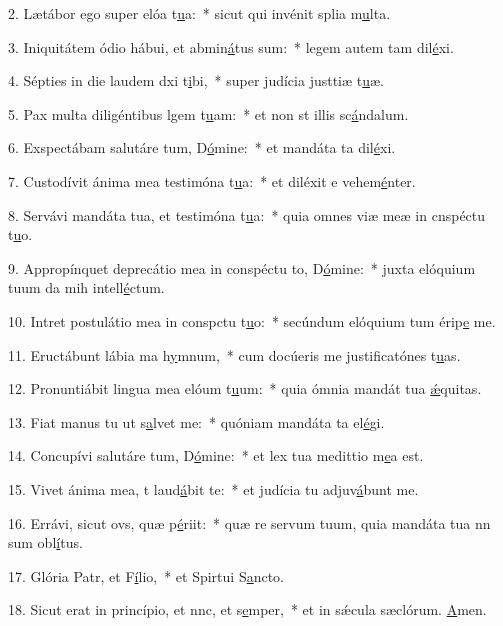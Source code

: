 2. Lætábor ego super elóa t\uline{u}a:~* sicut qui invénit splia m\uline{u}lta.\par 
3. Iniquitátem ódio hábui, et abmin\uline{á}tus sum:~* legem autem tam dil\uline{é}xi.\par 
4. Sépties in die laudem dxi t\uline{i}bi,~* super judícia justtiæ t\uline{u}æ.\par 
5. Pax multa diligéntibus lgem t\uline{u}am:~* et non st illis sc\uline{á}ndalum.\par 
6. Exspectábam salutáre tum, D\uline{ó}mine:~* et mandáta ta dil\uline{é}xi.\par 
7. Custodívit ánima mea testimóna t\uline{u}a:~* et diléxit e vehem\uline{é}nter.\par 
8. Servávi mandáta tua, et testimóna t\uline{u}a:~* quia omnes viæ meæ in cnspéctu t\uline{u}o.\par 
9. Appropínquet deprecátio mea in conspéctu to, D\uline{ó}mine:~* juxta elóquium tuum da mih intell\uline{é}ctum.\par 
10. Intret postulátio mea in conspctu t\uline{u}o:~* secúndum elóquium tum érip\uline{e} me.\par 
11. Eructábunt lábia ma h\uline{y}mnum,~* cum docúeris me justificatónes t\uline{u}as.\par 
12. Pronuntiábit lingua mea elóum t\uline{u}um:~* quia ómnia mandát tua \uline{ǽ}quitas.\par 
13. Fiat manus tu ut s\uline{a}lvet me:~* quóniam mandáta ta el\uline{é}gi.\par 
14. Concupívi salutáre tum, D\uline{ó}mine:~* et lex tua medittio m\uline{e}a est.\par 
15. Vivet ánima mea, t laud\uline{á}bit te:~* et judícia tu adjuv\uline{á}bunt me.\par 
16. Errávi, sicut ovs, quæ p\uline{é}riit:~* quæ re servum tuum, quia mandáta tua nn sum obl\uline{í}tus.\par 
17. Glória Patr, et F\uline{í}lio,~* et Spirtui S\uline{a}ncto.\par 
18. Sicut erat in princípio, et nnc, et s\uline{e}mper,~* et in sǽcula sæclórum. \uline{A}men.\par 
